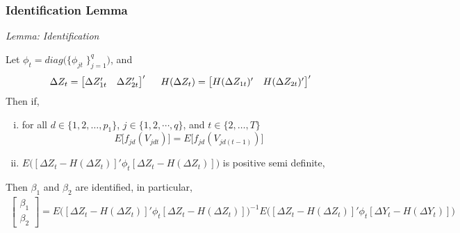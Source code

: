 \documentclass[9pt]{beamer}
\begin{document}
\begin{frame} 
\frametitle{Identification Lemma} 


\large \emph{Lemma: Identification } \normalsize \\
\vspace{0.25cm}

Let $\phi_{t} = diag\big( \{\phi_{jt}\;\}_{j=1}^q \big)$, and 
\begin{align*}
\Delta Z_t = \begin{bmatrix}  \Delta Z_{1t}' & \Delta Z_{2t}' \end{bmatrix}' \hspace{0.5cm} H(\Delta Z_{t}) = \begin{bmatrix}  H(\Delta Z_{1t})' & H(\Delta Z_{2t})' \end{bmatrix}'
\end{align*}
Then if,\\

\begin{enumerate}[i.)] 
\item for all $d\in \{1,2, \ldots , p_1\}$, $j\in \{1,2, \cdots , q\}$, and $t\in \{2, \ldots , T\}$
 $$E\big[ f_{jd}(V_{jdt})\big] = E\big[ f_{jd}(V_{jd(t-1)}) \big] 
$$
%
\item $E \Big( [\Delta Z_t - H(\Delta Z_t)]'\phi_{t}  [\Delta Z_t - H(\Delta Z_t)] \Big)$ is positive semi definite,
%
\end{enumerate}
\small
Then $\beta_1$ and $\beta_2$ are identified, in particular,
\begin{align*} 
\begin{bmatrix} \beta_1 \\[10pt] \beta_2 \end{bmatrix} = E \big( [\Delta Z_t - H(\Delta Z_t)]' \phi_{t} [\Delta Z_t - H(\Delta Z_t)] \big)^{-1}E \big( [\Delta Z_t - H(\Delta Z_t)]' \phi_{t} [\Delta Y_t - H(\Delta Y_t)] \big)
\end{align*} 
\normalsize

\end{frame}
\end{document}
